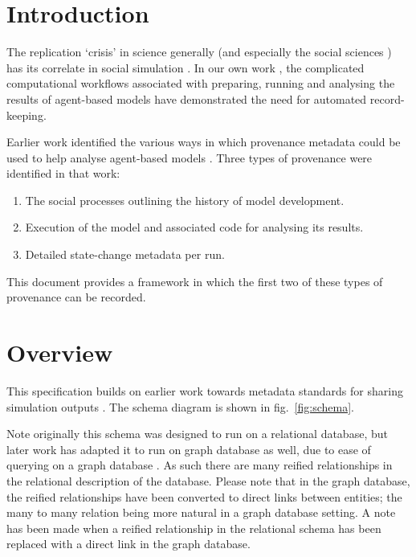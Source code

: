 \documentclass[
]{article}
\providecommand{\tightlist}{
  \setlength{\itemsep}{0pt}\setlength{\parskip}{0pt}}
\begin{document}
\section{Introduction}\label{introduction}

The replication `crisis' \citep{fanelli2018replication} in science
generally (and especially the social sciences
\citep{shrout2018replication}) has its correlate in social simulation
\citep{edmonds2003}. In our own work \citep{polhill2017lessons}, the
complicated computational workflows associated with preparing, running
and analysing the results of agent-based models have demonstrated the
need for automated record-keeping.

Earlier work identified the various ways in which provenance metadata
could be used to help analyse agent-based models
\citep{pignotti2013bigprov}. Three types of provenance were identified
in that work:

\begin{enumerate}
\def\labelenumi{\arabic{enumi}.}
\tightlist
\item
  The social processes outlining the history of model development.
\item
  Execution of the model and associated code for analysing its results.
\item
  Detailed state-change metadata per run.
\end{enumerate}

This document provides a framework in which the first two of these types
of provenance can be recorded.

\section{Overview}\label{overview}

This specification builds on earlier work towards metadata standards for
sharing simulation outputs \citep{polhill2014towards}. The schema
diagram is shown in fig.~\ref{fig:schema}.

Note originally this schema was designed to run on a relational
database, but later work has adapted it to run on graph database as
well, due to ease of querying on a graph database
\citep{davoudian2020big}. As such there are many reified relationships
in the relational description of the database. Please note that in the
graph database, the reified relationships have been converted to direct
links between entities; the many to many relation being more natural in
a graph database setting. A note has been made when a reified
relationship in the relational schema has been replaced with a direct
link in the graph database.
\end{document}
